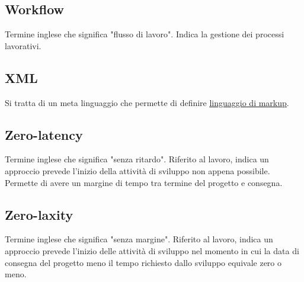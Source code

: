 	\subsection{Workflow}
	\label{sec:workflow}
	Termine inglese che significa "flusso di lavoro". Indica la gestione dei processi lavorativi.

	 \newpage
	\subsection{XML}
	\label{sec:xml}
	Si tratta di un meta linguaggio che permette di definire \underline{\hyperref[sec:linguaggiomarkup]{linguaggio di markup}}.

	\subsection{Zero-latency}
	\label{sec:zerolatency}
	Termine inglese che significa "senza ritardo". Riferito al lavoro, indica un approccio prevede l'inizio della attività di sviluppo non appena possibile. Permette di avere un margine di tempo tra termine del progetto e consegna.

	\subsection{Zero-laxity}
	\label{sec:zerolaxity}
	Termine inglese che significa "senza margine". Riferito al lavoro, indica un approccio prevede l'inizio delle attività di sviluppo nel momento in cui la data di consegna del progetto meno il tempo richiesto dallo sviluppo equivale zero o meno.

